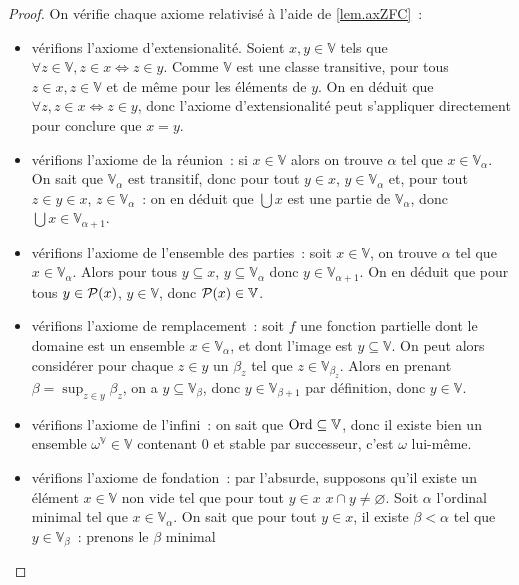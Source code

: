 \begin{proof}
  On vérifie chaque axiome relativisé à l'aide de \cref{lem.axZFC}~:
  \begin{itemize}
  \item vérifions l'axiome d'extensionalité. Soient $x,y\in \mathbb V$ tels que
    $\forall z\in \mathbb V, z\in x\iff z \in y$. Comme $\mathbb V$ est une
    classe transitive, pour tous $z\in x, z\in \mathbb V$ et de même pour les
    éléments de $y$. On en déduit que $\forall z, z\in x \iff z \in y$, donc
    l'axiome d'extensionalité peut s'appliquer directement pour conclure que
    $x = y$.
  \item vérifions l'axiome de la réunion~: si $x\in \mathbb V$ alors on trouve
    $\alpha$ tel que $x \in \mathbb V_\alpha$. On sait que $\mathbb V_\alpha$ est
    transitif, donc pour tout $y \in x$, $y \in \mathbb V_\alpha$ et, pour tout
    $z \in y \in x$, $z \in \mathbb V_\alpha$~: on en déduit que $\bigcup x$
    est une partie de $\mathbb V_\alpha$, donc
    $\bigcup x\in \mathbb V_{\alpha + 1}$.
  \item vérifions l'axiome de l'ensemble des parties~: soit $x\in \mathbb V$,
    on trouve $\alpha$ tel que $x \in\mathbb V_\alpha$. Alors pour tous
    $y\subseteq x$, $y\subseteq \mathbb V_\alpha$ donc
    $y\in\mathbb V_{\alpha +1}$. On en déduit que pour tous $y\in \mathcal{P}(x)$,
    $y\in \mathbb V$, donc $\mathcal{P}(x)\in\mathbb V$.
  \item vérifions l'axiome de remplacement~: soit $f$ une fonction partielle
    dont le domaine est un ensemble $x \in \mathbb V_\alpha$, et dont l'image
    est $y \subseteq \mathbb V$. On peut alors considérer pour chaque $z \in y$
    un $\beta_z$ tel que $z \in \mathbb V_{\beta_z}$. Alors en prenant
    $\beta = \sup_{z\in y} \beta_z$, on a $y \subseteq \mathbb V_\beta$, donc
    $y\in \mathbb V_{\beta + 1}$ par définition, donc $y \in \mathbb V$.
  \item vérifions l'axiome de l'infini~: on sait que $\operatorname{Ord}\subseteq\mathbb V$,
    donc il existe bien un ensemble $\omega^\mathbb V \in \mathbb V$
    contenant $0$ et stable par successeur, c'est $\omega$ lui-même.
  \item vérifions l'axiome de fondation~: par l'absurde, supposons qu'il existe
    un élément $x \in \mathbb V$ non vide tel que pour tout $y \in x$
    $x \cap y \neq \varnothing$. Soit $\alpha$ l'ordinal minimal tel que
    $x \in \mathbb V_\alpha$. On sait que pour tout $y \in x$, il existe
    $\beta < \alpha$ tel que $y \in \mathbb V_\beta$~: prenons le $\beta$ minimal

\end{itemize}
\end{proof}
